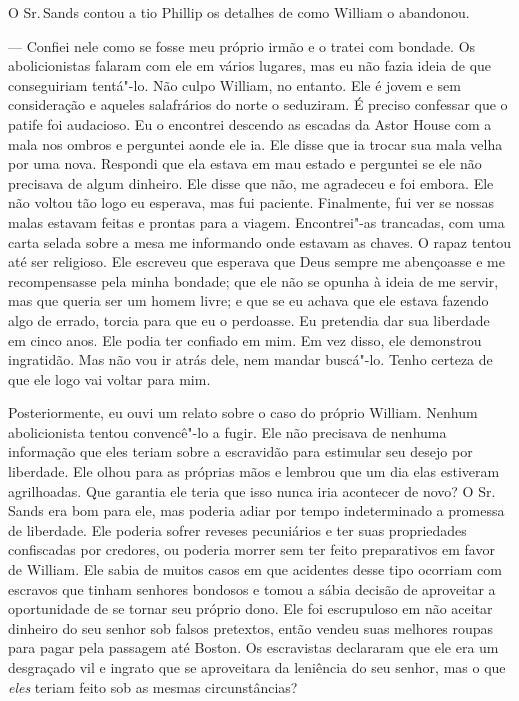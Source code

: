 O Sr.\,Sands contou a tio Phillip os
detalhes de como William o abandonou.

--- Confiei nele como se fosse meu próprio irmão e o tratei com bondade.
Os abolicionistas falaram com ele em vários lugares, mas eu não fazia
ideia de que conseguiriam tentá"-lo. Não culpo William, no entanto. Ele é
jovem e sem consideração e aqueles salafrários do norte o seduziram. É
preciso confessar que o patife foi audacioso. Eu o encontrei descendo as
escadas da Astor House com a mala nos ombros e perguntei aonde ele ia.
Ele disse que ia trocar sua mala velha por uma nova. Respondi que ela
estava em mau estado e perguntei se ele não precisava de algum dinheiro.
Ele disse que não, me agradeceu e foi embora. Ele não voltou tão logo eu
esperava, mas fui paciente. Finalmente, fui ver se nossas malas estavam
feitas e prontas para a viagem. Encontrei"-as trancadas, com uma carta
selada sobre a mesa me informando onde estavam as chaves. O rapaz tentou
até ser religioso. Ele escreveu que esperava que Deus sempre me
abençoasse e me recompensasse pela minha bondade; que ele não se opunha
à ideia de me servir, mas que queria ser um homem livre; e que se eu
achava que ele estava fazendo algo de errado, torcia para que eu o
perdoasse. Eu pretendia dar sua liberdade em cinco anos. Ele podia ter
confiado em mim. Em vez disso, ele demonstrou ingratidão. Mas não vou ir
atrás dele, nem mandar buscá"-lo. Tenho certeza de que ele logo vai
voltar para mim.

Posteriormente, eu ouvi um relato sobre
o caso do próprio William. Nenhum abolicionista tentou convencê"-lo a
fugir. Ele não precisava de nenhuma informação que eles teriam sobre a
escravidão para estimular seu desejo por liberdade. Ele olhou para as
próprias mãos e lembrou que um dia elas estiveram agrilhoadas. Que
garantia ele teria que isso nunca iria acontecer de novo? O Sr.\,Sands
era bom para ele, mas poderia adiar por tempo indeterminado a promessa
de liberdade. Ele poderia sofrer reveses pecuniários e ter suas
propriedades confiscadas por credores, ou poderia morrer sem ter feito
preparativos em favor de William. Ele sabia de muitos casos em que
acidentes desse tipo ocorriam com escravos que tinham senhores bondosos
e tomou a sábia decisão de aproveitar a oportunidade de se tornar seu
próprio dono. Ele foi escrupuloso em não aceitar dinheiro do seu senhor
sob falsos pretextos, então vendeu suas melhores roupas para pagar pela
passagem até Boston. Os escravistas declararam que ele era um desgraçado
vil e ingrato que se aproveitara da leniência do seu senhor, mas o que
\emph{eles} teriam feito sob as mesmas circunstâncias?

